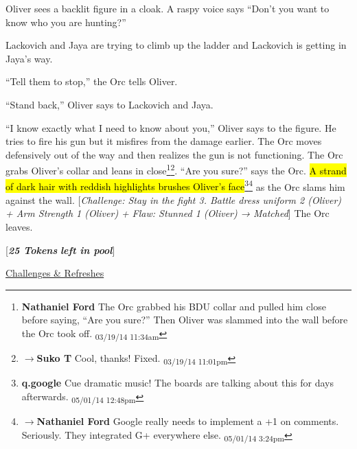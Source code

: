 Oliver sees a backlit figure in a cloak.  A raspy voice says ``Don't you want to know who you are hunting?''



Lackovich and Jaya are trying to climb up the ladder and Lackovich is getting in Jaya's way.  



``Tell them to stop,'' the Orc tells Oliver.

``Stand back,'' Oliver says to Lackovich and Jaya.



``I know exactly what I need to know about you,'' Oliver says to the figure.  He tries to fire his gun but it misfires from the damage earlier.   The Orc moves defensively out of the way and then realizes the gun is not functioning.  The Orc grabs Oliver's collar and leans in close\footnote{\textbf{Nathaniel Ford }The Orc grabbed his BDU collar and pulled him close before saying, ``Are you sure?'' Then Oliver was slammed into the wall before the Orc took off. \textsubscript{03/19/14 11:34am}}\footnote{$\rightarrow$\textbf{Suko T }Cool, thanks!  Fixed. \textsubscript{03/19/14 11:01pm}}.  ``Are you sure?'' says the Orc.  \hl{A strand of dark hair with reddish highlights brushes Oliver's face}\footnote{\textbf{q.google }Cue dramatic music!  The boards are talking about this for days afterwards. \textsubscript{05/01/14 12:48pm}}\footnote{$\rightarrow$\textbf{Nathaniel Ford }Google really needs to implement a +1 on comments. Seriously. They integrated G+ everywhere else. \textsubscript{05/01/14 3:24pm}} as the Orc slams him against the wall.  {[}\textit{Challenge: Stay in the fight 3.  Battle dress uniform 2 (Oliver) + Arm Strength 1 (Oliver) + }\textit{ {\color[RGB]{255,0,0}Flaw: Stunned 1 (Oliver)} }\textit{ → Matched}{]}  The Orc leaves.





{[}\textit{\textbf{25 Tokens}}\textit{\textbf{ left in pool}}{]}





\underline{  {\LARGE Challenges \& Refreshes }  }



